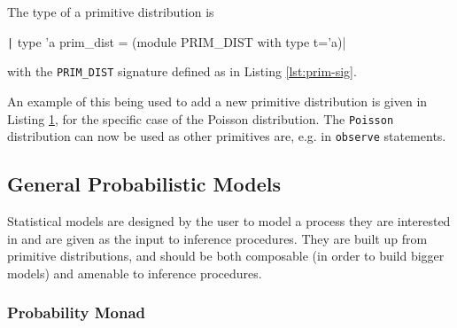 The type of a primitive distribution is 
\begin{center}
	\texttt| type 'a prim_dist = (module PRIM_DIST with type t='a)|
\end{center}
with the \texttt{PRIM\_DIST} signature defined as in Listing \ref{lst:prim-sig}.

\begin{figure}[!htb]
	\begin{minipage}{0.5\textwidth}
		\label{lst:prim-sig}
	\end{minipage}
	\begin{minipage}{0.5\textwidth}
		\label{lst:new-dist}
	\end{minipage}
\end{figure}
	
	
An example of this being used to add a new primitive distribution is given in Listing \ref{lst:new-dist}, for the specific case of the Poisson distribution. The \texttt{Poisson} distribution can now be used as other primitives are, e.g. in \texttt{observe} statements.
	
	
\subsection{General Probabilistic Models}
Statistical models are designed by the user to model a process they are interested in and are given as the input to inference procedures. They are built up from primitive distributions, and should be both composable (in order to build bigger models) and amenable to inference procedures.

\subsubsection{Probability Monad}
	
